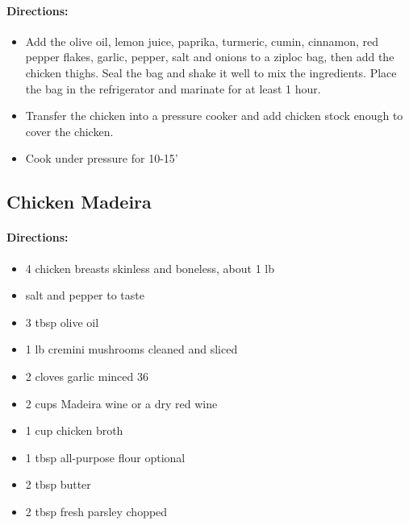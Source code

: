 \documentclass{article}
\begin{document}
\paragraph{Directions:}
\begin{itemize}
	\item Add the olive oil, lemon juice, paprika, turmeric, cumin, cinnamon, red pepper flakes, garlic, pepper, salt and onions to a ziploc bag, then add the chicken thighs. Seal the bag and shake it well to mix the ingredients. Place the bag in the refrigerator and marinate for at least 1 hour.
	\item Transfer the chicken into a pressure cooker and add chicken stock enough to cover the chicken.
	\item Cook under pressure for 10-15'
\end{itemize}

\subsection{Chicken Madeira}

\paragraph{Directions:}
\begin{itemize}
	\item 4 chicken breasts skinless and boneless, about 1 lb
	\item salt and pepper to taste
	\item 3 tbsp olive oil
	\item 1 lb cremini mushrooms cleaned and sliced
	\item 2 cloves garlic minced
	36  \item 2 cups Madeira wine or a dry red wine
	\item 1 cup chicken broth
	\item 1 tbsp all-purpose flour optional
	\item 2 tbsp butter
	\item 2 tbsp fresh parsley chopped
\end{itemize}
\end{document}
